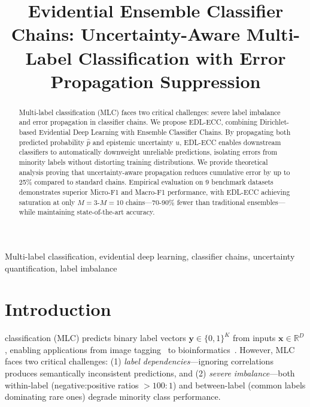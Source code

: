 \documentclass[conference]{IEEEtran}
\begin{document}
\title{Evidential Ensemble Classifier Chains: Uncertainty-Aware Multi-Label Classification with Error Propagation Suppression}

\author{
}

\maketitle

\begin{abstract}
Multi-label classification (MLC) faces two critical challenges: severe label imbalance and error propagation in classifier chains. We propose EDL-ECC, combining Dirichlet-based Evidential Deep Learning with Ensemble Classifier Chains. By propagating both predicted probability $\hat{p}$ and epistemic uncertainty $u$, EDL-ECC enables downstream classifiers to automatically downweight unreliable predictions, isolating errors from minority labels without distorting training distributions. We provide theoretical analysis proving that uncertainty-aware propagation reduces cumulative error by up to 25\% compared to standard chains. Empirical evaluation on 9 benchmark datasets demonstrates superior Micro-F1 and Macro-F1 performance, with EDL-ECC achieving saturation at only $M=3$-$M=10$ chains—70-90\% fewer than traditional ensembles—while maintaining state-of-the-art accuracy.
\end{abstract}

\begin{IEEEkeywords}
Multi-label classification, evidential deep learning, classifier chains, uncertainty quantification, label imbalance
\end{IEEEkeywords}

\section{Introduction}

 classification (MLC) predicts binary label vectors $\mathbf{y} \in \{0,1\}^K$ from inputs $\mathbf{x} \in \mathbb{R}^D$, enabling applications from image tagging~\cite{boutell2004learning} to bioinformatics~\cite{chou2001prediction}. However, MLC faces two critical challenges: (1) \textit{label dependencies}—ignoring correlations produces semantically inconsistent predictions, and (2) \textit{severe imbalance}—both within-label (negative:positive ratios $>100:1$) and between-label (common labels dominating rare ones) degrade minority class performance.
\end{document}
